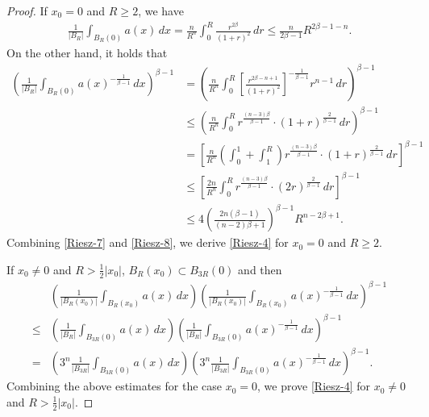 \documentclass[12pt]{amsart}
\begin{document}
\begin{proof}
		If $x_0=0 $ and $R\geq 2$, we have
		\begin{equation}\label{Riesz-7}
			\begin{aligned}
				\frac{1}{|B_R|} \int_{B_R(0)} a(x)\, dx  = \frac{n}{R^n } \int_0^R \frac{r^{2\beta}}{(1+r)^2} \, dr  \leq \frac{n}{2\beta-1} R^{2\beta-1-n}. 
			\end{aligned} 
		\end{equation}
		On the other hand, it holds that
		\begin{equation}\label{Riesz-8}
			\begin{aligned}
				\left(  \frac{1}{|B_R| } \int_{B_R(0)} a(x)^{-\frac{1}{\beta-1}} \, dx \right)^{\beta-1} & = \left(\frac{n}{R^n} \int_0^R   \left[ \frac{r^{2\beta-n+1}}{(1+r)^2} \right]^{-\frac{1}{\beta-1}} r^{n-1} \, dr  \right)^{\beta-1} \\
				& \leq \left(\frac{n}{R^n} \int_0^R r^{\frac{(n-3)\beta}{\beta-1}} \cdot (1+r)^{\frac{2}{\beta-1}} \, dr  \right)^{\beta-1} \\
				& = \left[\frac{n}{R^n}\left(\int_0^1 + \int_1^R\right) r^{\frac{(n-3)\beta}{\beta-1}} \cdot (1+r)^{\frac{2}{\beta-1}}  \, dr \right]^{\beta-1} \\
				& \leq \left[\frac{2n}{R^n} \int_0^R  r^{\frac{(n-3)\beta}{\beta-1}} \cdot (2r)^{\frac{2}{\beta-1}}  \, dr \right]^{\beta-1}\\
				& \leq  4\left( \frac{2n (\beta-1)}{ (n-2)\beta +1  } \right)^{\beta-1} R^{n-2\beta +1}. 
			\end{aligned}
		\end{equation}
		Combining \eqref{Riesz-7} and \eqref{Riesz-8}, we derive \eqref{Riesz-4} for $x_0= 0$ and $R\geq 2$. 
		
		If $x_0\neq 0$ and $R> \frac12 |x_0|$, 
		$B_R(x_0) \subset B_{3R}(0)$ and then
		\begin{equation*}\label{Riesz-9}
			\begin{aligned}      
				& \left( \frac{1}{|B_R(x_0)|} \int_{B_R(x_0)} a(x)\, dx  \right) \left( \frac{1}{|B_R(x_0)|} \int_{B_R(x_0)} a(x)^{-\frac{1}{\beta-1}} \, dx\right)^{\beta-1}   \\
				\leq   & \left( \frac{1}{|B_R|} \int_{B_{3R}(0)} a(x)\, dx  \right) \left( \frac{1}{|B_R|} \int_{B_{3R}(0)} a(x)^{-\frac{1}{\beta-1}} \, dx\right)^{\beta-1}\\
				=   & \left( 3^n\frac{1}{|B_{3R}|} \int_{B_{3R}(0)} a(x)\, dx  \right) \left( 3^n \frac{1}{|B_{3R}|} \int_{B_{3R}(0)} a(x)^{-\frac{1}{\beta-1}} \, dx\right)^{\beta-1}. 
			\end{aligned}
		\end{equation*}
		Combining the above estimates for the case $x_0=0$, we prove \eqref{Riesz-4} for $x_0 \neq 0$ and $R>\frac12 |x_0|$. 
		

\end{proof}
\end{document}
